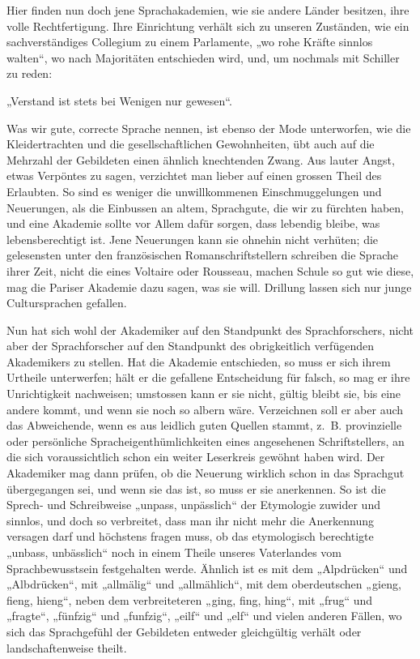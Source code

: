 Hier finden nun doch jene Sprachakademien, wie sie andere Länder besitzen, ihre volle Rechtfertigung. Ihre Einrichtung verhält sich zu unseren Zuständen, wie ein sachverständiges Collegium zu einem Parlamente, „wo rohe Kräfte sinnlos walten“, wo nach Majoritäten entschieden wird, und, um nochmals mit Schiller zu reden:

\begin{center}
„Verstand ist stets bei Wenigen nur gewesen“.
\end{center}

Was wir gute, correcte Sprache nennen, ist ebenso der Mode unterworfen, wie die Kleidertrachten und die gesellschaftlichen Gewohnheiten, übt auch auf die Mehrzahl der Gebildeten einen ähnlich knechtenden Zwang. Aus lauter Angst, etwas Verpöntes zu sagen, verzichtet man lieber auf einen grossen Theil des Erlaubten. So sind es weniger die unwillkommenen Einschmuggelungen und Neuerungen, als die Einbussen an altem,  Sprachgute, die wir zu fürchten haben, und eine Akademie sollte vor Allem dafür sorgen, dass lebendig bleibe, was lebensberechtigt ist. Jene Neuerungen kann sie ohnehin nicht verhüten; die gelesensten unter den französischen Romanschriftstellern schreiben die Sprache ihrer Zeit, nicht die eines Voltaire oder Rousseau, machen Schule so gut wie diese, mag die Pariser Akademie dazu sagen, was sie will.  Drillung lassen sich nur junge Cultursprachen gefallen.

Nun hat sich wohl der Akademiker auf den Standpunkt des Sprachforschers, nicht aber der Sprachforscher auf den Standpunkt des obrigkeitlich verfügenden Akademikers zu stellen. Hat die Akademie entschieden, so muss er sich ihrem Urtheile unterwerfen; hält er die gefallene Entscheidung für falsch, so mag er ihre Unrichtigkeit nachweisen; umstossen kann er sie nicht, gültig bleibt sie, bis eine andere kommt, und wenn sie noch so albern wäre. Verzeichnen soll er aber auch das Abweichende, wenn es aus leidlich guten Quellen stammt, z.~B. provinzielle oder persönliche Spracheigenthümlichkeiten eines angesehenen Schriftstellers, an die sich voraussichtlich schon ein weiter Leserkreis gewöhnt haben wird. Der Akademiker mag dann prüfen, ob die Neuerung wirklich schon in das Sprachgut übergegangen sei, und wenn sie das ist, so muss er sie anerkennen. So ist die Sprech- und Schreibweise „unpass, unpässlich“ der Etymologie zuwider und sinnlos, und doch so verbreitet, dass man ihr nicht mehr \label{sp.127} die Anerkennung versagen darf und höchstens \label{fp.135} fragen muss, ob das etymologisch berechtigte „unbass, unbässlich“ noch in einem Theile unseres Vaterlandes vom Sprachbewusstsein festgehalten werde. Ähnlich ist es mit dem „Alpdrücken“ und „Albdrücken“, mit „allmälig“ und „allmählich“, mit dem oberdeutschen „gieng, fieng, hieng“, neben dem verbreiteteren „ging, fing, hing“, mit „frug“ und „fragte“, „fünfzig“ und „funfzig“, „eilf“ und „elf“ und vielen anderen Fällen, wo sich das Sprachgefühl der Gebildeten entweder gleichgültig verhält oder landschaftenweise theilt.

